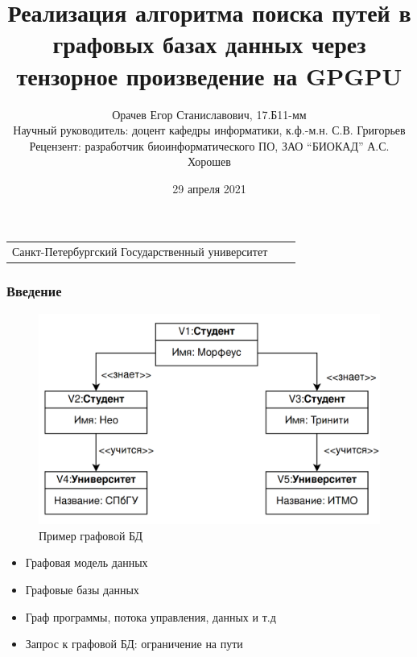 \documentclass[aspectratio=169,xcolor=table,english]{beamer}
\title[Tensor CFPQ GPGPU]{Реализация алгоритма поиска путей в графовых базах данных через тензорное произведение на GPGPU}
\institute[СПбГУ]{
Программная инженерия
}
\author[Егор Орачев]{Орачев Егор Станиславович, 17.Б11-мм \\Научный руководитель: доцент кафедры информатики, к.ф.-м.н. С.В. Григорьев\\Рецензент: разработчик биоинформатического ПО, ЗАО “БИОКАД” А.С. Хорошев}
\date{29 апреля 2021}
\begin{document}
{
\begin{frame}[fragile]
  \begin{table}
  \centering
  \begin{tabularx}{\linewidth}{YcX}
    \begin{minipage}[t]{1.0\textwidth}\center 
    Санкт-Петербургский Государственный университет
      \end{minipage}
  \end{tabularx}
  \end{table}
  \titlepage
\end{frame}
}

\begin{frame}[fragile] \frametitle{Введение}
    \begin{minipage}[m]{0.6\linewidth}
        \begin{figure}
            \centering
            \includegraphics[width=\textwidth]{figures/db_example.png}
            \caption{Пример графовой БД}
            \label{fig:architecture}
        \end{figure}
    \end{minipage}\hfill
    \begin{minipage}[m]{0.4\linewidth}
        \begin{itemize}
            \item Графовая модель данных
            \item Графовые базы данных
            \item Граф программы, потока управления, данных и т.д
            \item Запрос к графовой БД: ограничение на пути
        \end{itemize}
    \end{minipage}
\end{frame}
\end{document}
